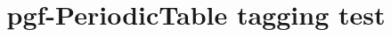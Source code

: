 \documentclass{article}
\title{pgf-PeriodicTable tagging test}
\begin{document}
\pgfPT
\end{document}
